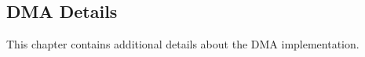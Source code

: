 \begin{appendix}

\chapter{DMA Details}

This chapter contains additional details about the DMA implementation.

%
%
%

\end{appendix}
